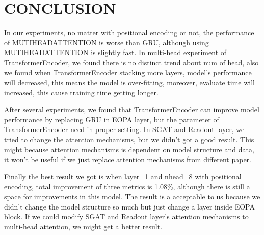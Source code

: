 \documentclass{article}
\begin{document}

\section{CONCLUSION}

In our experiments, no matter with positional encoding or not,
the performance of MUTIHEADATTENTION is worse than GRU,
although using MUTIHEADATTENTION is slightly fast.
In multi-head experiment of TransformerEncoder,
we found there is no distinct trend about num of head,
also we found when TransformerEncoder stacking more layers,
model's performance will decreased, this means the model is over-fitting,
moreover, evaluate time will increased, this cause training time getting longer.

After several experiments, we found that TransformerEncoder can improve
model performance by replacing GRU in EOPA layer,
but the parameter of TransformerEncoder need in proper setting.
In SGAT and Readout layer, we tried to change the attention mechanisms,
but we didn't got a good result.
This might because attention mechanisms is dependent on model structure and data,
it won't be useful if we just replace attention mechanisms from different paper.

Finally the best result we got is when layer=1 and nhead=8
with positional encoding, total improvement of three metrics is  1.08\%,
although there is still a space for improvements in this model.
The result is a acceptable to us because we didn't change the model structure
so much but just change a layer inside EOPA block.
If we could modify SGAT and Readout layer's attention mechanisms
to multi-head attention, we might get a better result.





\end{document}
